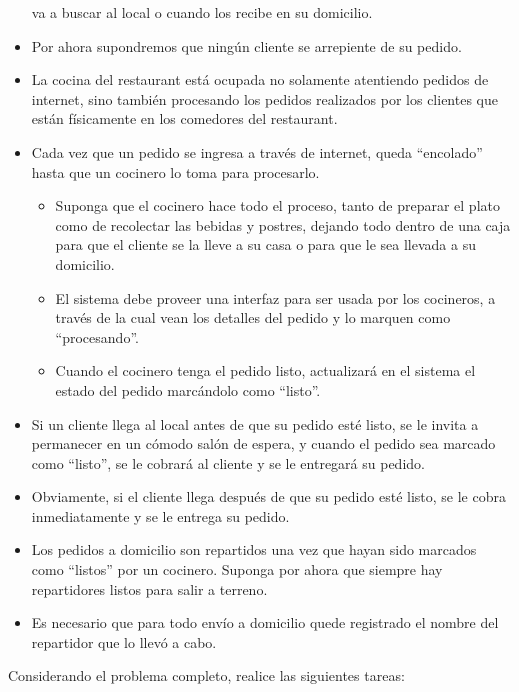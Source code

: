 \documentclass[11pt,letterpaper]{article}
\begin{document}
\begin{spacing}{1.2}
\begin{Problem}
\begin{itemize}
    va a buscar al local o cuando los recibe en su domicilio.
        \item Por ahora supondremos que ningún cliente se arrepiente de su pedido.
        \item La cocina del restaurant está ocupada no solamente atentiendo pedidos
            de internet, sino también procesando los pedidos realizados por los clientes 
            que están físicamente en los comedores del restaurant.
        \item Cada vez que un pedido se ingresa a través de internet, queda ``encolado''
            hasta que un cocinero lo toma para procesarlo.
        \begin{itemize}
            \item Suponga que el cocinero hace todo el proceso, tanto de preparar el plato
                como de recolectar las bebidas y postres, dejando todo dentro de una caja para que
                el cliente se la lleve a su casa o para que le sea llevada a su domicilio.
            \item  El sistema debe proveer una interfaz para ser usada por los cocineros, a través de la cual
                vean los detalles del pedido y lo marquen como ``procesando''.
            \item Cuando el cocinero tenga el
            pedido listo, actualizará en el sistema el estado del pedido marcándolo como ``listo''.
        \end{itemize}
        \item Si un cliente llega al local antes de que su pedido esté listo, se le invita a
            permanecer en un cómodo salón de espera, y cuando el pedido sea marcado como ``listo'',
            se le cobrará al cliente y se le entregará su pedido.
        \item Obviamente, si el cliente llega después de que su pedido esté listo, se le cobra
            inmediatamente y se le entrega su pedido.
        \item Los pedidos a domicilio son repartidos una vez que hayan sido marcados
            como ``listos'' por un cocinero. Suponga por ahora que siempre hay repartidores
            listos para salir a terreno.
        \item Es necesario que para todo envío a domicilio quede registrado el nombre del repartidor que
            lo llevó a cabo.
    \end{itemize}

    \vspace{1em}
    Considerando el problema completo, realice las siguientes tareas:


\end{Problem}
\end{spacing}
\end{document}
